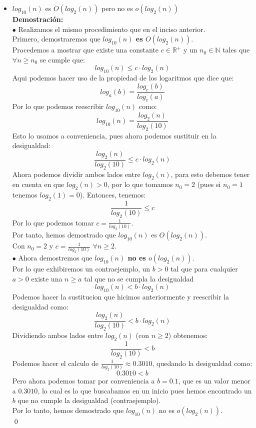 \documentclass[12pt]{article}
\begin{document}
\begin{itemize}
\begin{itemize}
            \item $log_{10}(n)$ es $O(log_2(n))$ pero no es $o(log_2(n))$\\
            \textbf{Demostración:}\\
            $\bullet$ Realizamos el mismo procedimiento que en el inciso anterior.\\
            Primero, demostraremos que \textbf{$log_{10}(n)$ es $O(log_2(n))$}.\\
            Procedemos a mostrar que existe una constante $c \in \mathbb{R^{+}}$ y un $n_0 \in \mathbb{N}$ tales que $\forall n \geq n_0$ se cumple que:
            \[
            log_{10}(n) \leq c \cdot log_2(n)
            \]
            Aqui podemos hacer uso de la propiedad de los logaritmos que dice que:
            \[
            log_a(b) = \frac{log_c(b)}{log_c(a)}
            \]
            Por lo que podemos reescribir $log_{10}(n)$ como:
            \[
            log_{10}(n) = \frac{log_2(n)}{log_2(10)}
            \]
            Esto lo usamos a conveniencia, pues ahora podemos sustituir en la desigualdad:
            \[
            \frac{log_2(n)}{log_2(10)} \leq c \cdot log_2(n)
            \]
            Ahora podemos dividir ambos lados entre $log_2(n)$, para esto debemos tener en cuenta en que $log_2(n) > 0$, por lo que tomamos $n_0 = 2$ (pues si $n_0 = 1$ tenemos $log_2(1) = 0$). Entonces, tenemos:
            \[
            \frac{1}{log_2(10)} \leq c
            \]
            Por lo que podemos tomar $c = \frac{1}{log_2(10)}$.\\
            Por tanto, hemos demostrado que $log_{10}(n)$ es $O(log_2(n))$.\\
            Con $n_0 = 2$ y $c = \frac{1}{log_2(10)}$ $\forall n \geq 2$.\\


            $\bullet$ Ahora demostremos que \textbf{$log_{10}(n)$ no es $o(log_2(n))$}.\\
            Por lo que exhibiremos un contraejemplo, un $b > 0$ tal que para cualquier $a > 0$ existe una $n \geq a$ tal que no se cumpla la desigualdad
            \[
            log_{10}(n) < b \cdot log_2(n)
            \]
            Podemos hacer la sustitucion que hicimos anteriormente y reescribir la desigualdad como:
            \[
            \frac{log_2(n)}{log_2(10)} < b \cdot log_2(n)
            \]
            Dividiendo ambos lados entre $log_2(n)$ (con $n \geq 2$) obtenemos:
            \[
            \frac{1}{log_2(10)} < b
            \]
            Podemos hacer el calculo de $\frac{1}{log_2(10)} \approx 0.3010$, quedando la desigualdad como:
            \[
            0.3010 < b
            \]
            Pero ahora podemos tomar por conveniencia a $b = 0.1$, que es un valor menor a $0.3010$, lo cual es lo que buscabamos en un inicio pues hemos encontrado un $b$ que no cumple la desigualdad (contraejemplo).\\
            Por lo tanto, hemos demostrado que $log_{10}(n)$ no es $o(log_2(n))$.\\
            \qed





\end{itemize}
\end{itemize}
\end{document}
